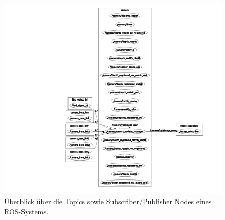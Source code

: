 		\begin{figure}[H]
		\centering
		\includegraphics[width=0.7\linewidth]{../media/rqt-graph}
		\caption{Überblick über die Topics sowie Subscriber/Publisher Nodes eines ROS-Systems.}
		\label{fig:rqt-graph}
		\end{figure}


